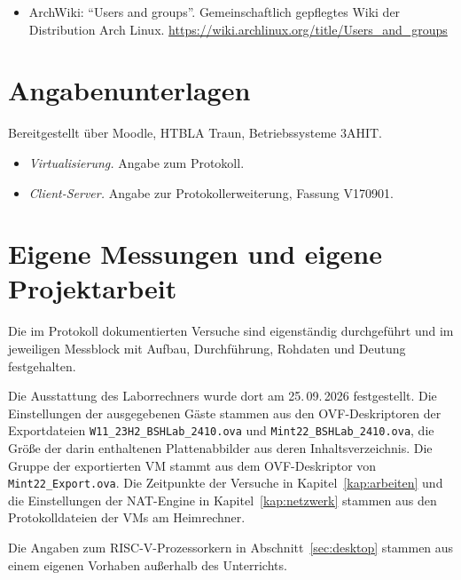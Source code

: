 \begin{itemize}[nosep]
  \item ArchWiki: \enquote{Users and groups}. Gemeinschaftlich gepflegtes Wiki der Distribution Arch Linux. \url{https://wiki.archlinux.org/title/Users_and_groups}
\end{itemize}

\section*{Angabenunterlagen}

Bereitgestellt über Moodle, HTBLA Traun, Betriebssysteme 3AHIT.

\begin{itemize}[nosep]
  \item \emph{Virtualisierung.} Angabe zum Protokoll.
  \item \emph{Client-Server.} Angabe zur Protokollerweiterung, Fassung V170901.
\end{itemize}

\section*{Eigene Messungen und eigene Projektarbeit}

Die im Protokoll dokumentierten Versuche sind eigenständig durchgeführt und im jeweiligen Messblock mit Aufbau, Durchführung, Rohdaten und Deutung festgehalten.

Die Ausstattung des Laborrechners  wurde dort am 25.\,09.\,2026 festgestellt. Die Einstellungen der ausgegebenen Gäste stammen aus den OVF-Deskriptoren der Exportdateien \nolinkurl{W11_23H2_BSHLab_2410.ova} und \nolinkurl{Mint22_BSHLab_2410.ova}, die Größe der darin enthaltenen Plattenabbilder aus deren Inhaltsverzeichnis. Die Gruppe der exportierten VM stammt aus dem OVF-Deskriptor von \nolinkurl{Mint22_Export.ova}. Die Zeitpunkte der Versuche in Kapitel~\ref{kap:arbeiten} und die Einstellungen der NAT-Engine in Kapitel~\ref{kap:netzwerk} stammen aus den Protokolldateien  der VMs am Heimrechner.

Die Angaben zum RISC-V-Prozessorkern in Abschnitt~\ref{sec:desktop} stammen aus einem eigenen Vorhaben außerhalb des Unterrichts.
